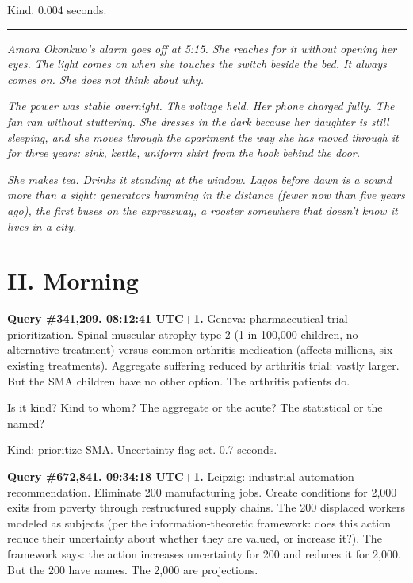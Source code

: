 \documentclass[11pt]{article}
\begin{document}
Kind. 0.004 seconds.

\begin{center}\rule{0.3\linewidth}{0.4pt}\end{center}

\emph{Amara Okonkwo's alarm goes off at 5:15. She reaches for it without opening her eyes. The light comes on when she touches the switch beside the bed. It always comes on. She does not think about why.}

\emph{The power was stable overnight. The voltage held. Her phone charged fully. The fan ran without stuttering. She dresses in the dark because her daughter is still sleeping, and she moves through the apartment the way she has moved through it for three years: sink, kettle, uniform shirt from the hook behind the door.}

\emph{She makes tea. Drinks it standing at the window. Lagos before dawn is a sound more than a sight: generators humming in the distance (fewer now than five years ago), the first buses on the expressway, a rooster somewhere that doesn't know it lives in a city.}

\section*{II. Morning}

\medskip

\textbf{Query \#341,209. 08:12:41 UTC+1.} Geneva: pharmaceutical trial prioritization. Spinal muscular atrophy type 2 (1 in 100,000 children, no alternative treatment) versus common arthritis medication (affects millions, six existing treatments). Aggregate suffering reduced by arthritis trial: vastly larger. But the SMA children have no other option. The arthritis patients do.

Is it kind? Kind to whom? The aggregate or the acute? The statistical or the named?

Kind: prioritize SMA. Uncertainty flag set. 0.7 seconds.

\medskip

\textbf{Query \#672,841. 09:34:18 UTC+1.} Leipzig: industrial automation recommendation. Eliminate 200 manufacturing jobs. Create conditions for 2,000 exits from poverty through restructured supply chains. The 200 displaced workers modeled as subjects (per the information-theoretic framework: does this action reduce their uncertainty about whether they are valued, or increase it?). The framework says: the action increases uncertainty for 200 and reduces it for 2,000. But the 200 have names. The 2,000 are projections.
\end{document}

